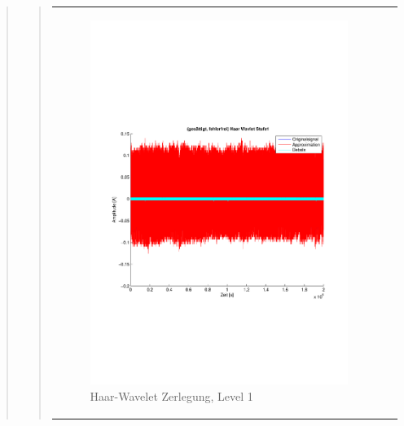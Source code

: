 \begin{quote}
\begin{quote}
\begin{center}
\begin{tabular}{ll}
\begin{minipage}{0.6\textwidth}
                        \begin{figure}[H]
                            \label{fig:}
                            \includegraphics[scale=0.4, trim = 2cm 6cm 1cm
                            7.5cm,
                            clip]{./Bilder/Termin8/fehlerfrei_gesaettigt_Haar_Wavlet_lvl_1}
                            \caption{Haar-Wavelet Zerlegung, Level 1}
                        \end{figure}
    
                    \end{minipage}
                    \begin{minipage}{0.6\textwidth}
    

\end{minipage}
\end{tabular}
\end{center}
\end{quote}
\end{quote}
